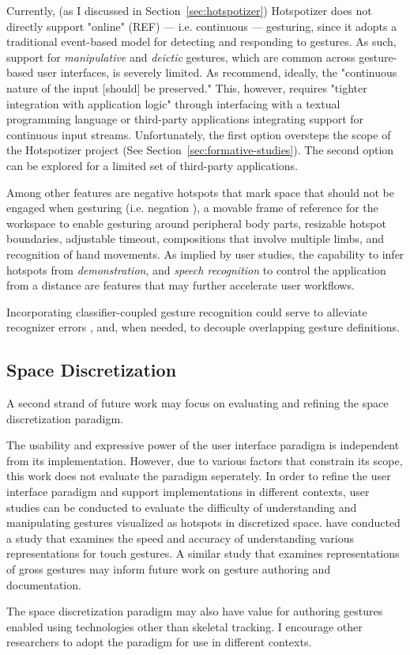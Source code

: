 Currently, (as I discussed in Section~\ref{sec:hotspotizer}) Hotspotizer does not directly support "online" (REF) --- i.e. continuous --- gesturing, since it adopts a traditional event-based model for detecting and responding to gestures. As such, support for \emph{manipulative} and \emph{deictic} gestures, which are common across gesture-based user interfaces, is severely limited. As \textcite{Myers:2000} recommend, ideally, the "continuous nature of the input [should] be preserved." This, however, requires "tighter integration with application logic" \parencite{Hartmann:2007} through interfacing with a textual programming language or third-party applications integrating support for continuous input streams. Unfortunately,  the first option oversteps the scope of the Hotspotizer project (See Section~\ref{sec:formative-studies}). The second option can be explored for a limited set of third-party applications.

Among other features are negative hotspots that mark space that should not be engaged when gesturing (i.e. negation \parencite{Hoste:2014}), a movable frame of reference for the workspace to enable gesturing around peripheral body parts, resizable hotspot boundaries, adjustable timeout, compositions that involve multiple limbs, and recognition of hand movements.  As implied by user studies, the capability to infer hotspots from \emph{demonstration}, and \emph{speech recognition} to control the application from a distance are features that may further accelerate user workflows.

Incorporating classifier-coupled gesture recognition \parencite{Hoste:2013} could serve to alleviate recognizer errors \parencite{Myers:2000}, and, when needed, to decouple overlapping gesture definitions.

\subsection{Space Discretization}

A second strand of future work may focus on evaluating and refining the space discretization paradigm.

The usability and expressive power of the user interface paradigm is independent from its implementation. However, due to various factors that constrain its scope, this work does not evaluate the paradigm seperately. In order to refine the user interface paradigm and support implementations in different contexts, user studies can be conducted to evaluate the difficulty of understanding and manipulating gestures visualized as hotspots in discretized space. \textcite{Kin:2012} have conducted a study that examines the speed and accuracy of understanding various representations for touch gestures. A similar study that examines representations of gross gestures may inform future work on gesture authoring and documentation.

The space discretization paradigm may also have value for authoring gestures enabled using technologies other than skeletal tracking. I encourage other researchers to adopt the paradigm for use in different contexts.
